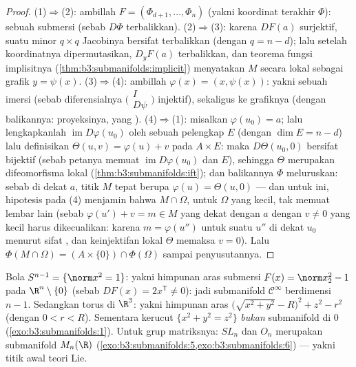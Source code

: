 \begin{proof}
(1)$\Rightarrow$(2): ambillah $F = (\Phi_{d+1}, \dots, \Phi_n)$ (yakni koordinat
terakhir $\Phi$): sebuah submersi (sebab $D\Phi$ terbalikkan).
(2)$\Rightarrow$(3): karena $DF(a)$ surjektif, suatu minor $q \times q$
Jacobinya bersifat terbalikkan (dengan $q = n - d$); lalu setelah
koordinatnya dipermutasikan, $D_yF(a)$ terbalikkan, dan teorema fungsi implisitnya (\cref{thm:b3:submanifolds:implicit})
menyatakan $M$ secara lokal sebagai grafik $y = \psi(x)$.
(3)$\Rightarrow$(4): ambillah $\varphi(x) = (x, \psi(x))$: yakni sebuah
imersi (sebab diferensialnya $\bigl(\begin{smallmatrix}I\\
D\psi\end{smallmatrix}\bigr)$ injektif), sekaligus  ke
grafiknya (dengan balikannya: proyeksinya, yang ).
(4)$\Rightarrow$(1): misalkan $\varphi(u_0) = a$; lalu lengkapkanlah
$\operatorname{im}D\varphi(u_0)$ oleh sebuah pelengkap $E$
(dengan $\dim E = n - d$) lalu definisikan $\Theta(u, v) = \varphi(u) + v$
pada $A\times E$: maka $D\Theta(u_0, 0)$ bersifat bijektif (sebab petanya
memuat $\operatorname{im}D\varphi(u_0)$ dan $E$), sehingga
$\Theta$ merupakan difeomorfisma lokal
(\cref{thm:b3:submanifolds:ift}); dan balikannya $\Phi$
meluruskan: sebab di dekat $a$, titik $M$ tepat berupa
$\varphi(u) = \Theta(u, 0)$ --- dan untuk ini, hipotesis 
pada (4) menjamin bahwa $M\cap\Omega$, untuk $\Omega$ yang kecil,
tak memuat lembar lain (sebab $\varphi(u') + v = m \in
M$ yang dekat dengan $a$ dengan $v \neq 0$ yang kecil harus dikecualikan:
karena $m = \varphi(u'')$ untuk suatu $u''$ di dekat $u_0$ menurut
sifat , dan keinjektifan lokal $\Theta$
memaksa $v = 0$). Lalu $\Phi(M\cap\Omega) = (A\times\{0\})
\cap\Phi(\Omega)$ sampai penyusutannya.
\end{proof}

\begin{example}\label{ex:b3:submanifolds:examples}
Bola $S^{n-1} = \{\norm x^2 = 1\}$: yakni himpunan aras
submersi $F(x) = \norm x_2^2 - 1$ pada
$\R^n\setminus\{0\}$ (sebab $DF(x) = 2x^{\mathsf T} \ne 0$):
jadi submanifold $\mathcal C^\infty$ berdimensi $n - 1$. Sedangkan
torus di $\R^3$: yakni himpunan aras $\bigl(\sqrt{x^2 + y^2} -
R\bigr)^2 + z^2 - r^2$ (dengan $0 < r < R$). Sementara kerucut $\{x^2 + y^2 =
z^2\}$ \emph{bukan} submanifold di $0$
(\cref{exo:b3:submanifolds:1}). Untuk grup matriksnya: $SL_n$ dan
$O_n$ merupakan submanifold $M_n(\R)$
(\cref{exo:b3:submanifolds:5,exo:b3:submanifolds:6}) --- yakni
titik awal teori Lie.
\end{example}

